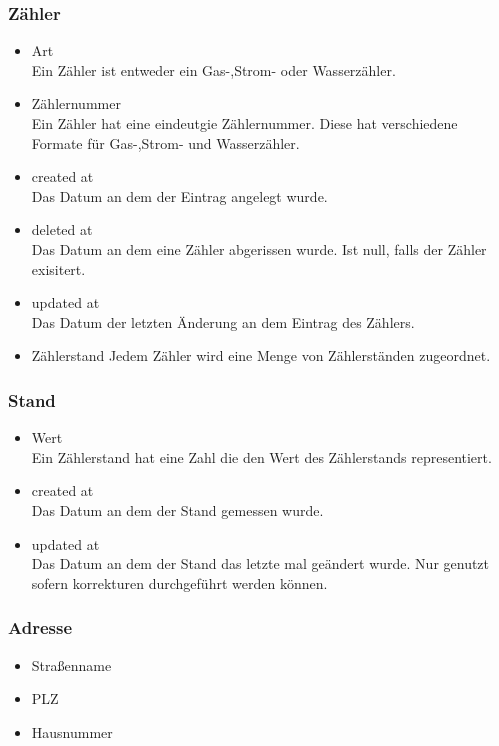 \subsubsection*{Zähler}
	\begin{itemize}
		\item Art\hfill \\
		Ein Zähler ist entweder ein Gas-,Strom- oder Wasserzähler.
		\item Zählernummer\hfill \\
		Ein Zähler hat eine eindeutgie Zählernummer. Diese hat verschiedene Formate für Gas-,Strom- und Wasserzähler.
		\item created at\hfill \\
		Das Datum an dem der Eintrag angelegt wurde.
		\item deleted at\hfill \\
		Das Datum an dem eine Zähler abgerissen wurde. Ist null, falls der Zähler exisitert.
		\item updated at\hfill \\
		Das Datum der letzten Änderung an dem Eintrag des Zählers.
		\item Zählerstand
		Jedem Zähler wird eine Menge von Zählerständen zugeordnet.
	\end{itemize}
\subsubsection*{Stand}
	\begin{itemize}
		\item Wert\hfill \\
		Ein Zählerstand hat eine Zahl die den Wert des Zählerstands representiert.
		\item created at\hfill \\
		Das Datum an dem der Stand gemessen wurde.
		\item updated at\hfill \\
		Das Datum an dem der Stand das letzte mal geändert wurde. Nur genutzt sofern korrekturen durchgeführt werden können.
	\end{itemize}
\subsubsection*{Adresse}
	\begin{itemize}
		\item Straßenname
		\item PLZ
		\item Hausnummer
	\end{itemize}
